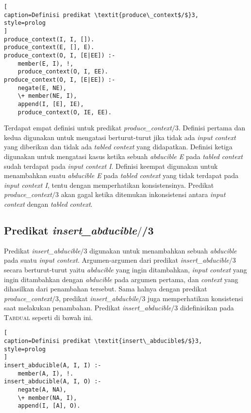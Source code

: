 \begin{lstlisting}[
caption=Definisi predikat \textit{produce\_context$/$}3,
style=prolog
]
produce_context(I, I, []).
produce_context(E, [], E).
produce_context(O, I, [E|EE]) :-
	member(E, I), !,
	produce_context(O, I, EE).
produce_context(O, I, [E|EE]) :-
	negate(E, NE),
	\+ member(NE, I),
	append(I, [E], IE),
	produce_context(O, IE, EE).
\end{lstlisting}

Terdapat empat definisi untuk predikat \textit{produce\_context$/$}3. Definisi pertama dan kedua digunakan untuk mengatasi berturut-turut jika tidak ada \textit{input context} yang diberikan dan tidak ada \textit{tabled context} yang didapatkan. Definisi ketiga digunakan untuk mengatasi kasus ketika sebuah \textit{abducible E} pada \textit{tabled context} sudah terdapat pada \textit{input context I}. Definisi keempat digunakan untuk menambahkan suatu \textit{abducible E} pada \textit{tabled context} yang tidak terdapat pada \textit{input context I}, tentu dengan memperhatikan konsistensinya. Predikat \textit{produce\_context$/$}3 akan gagal ketika ditemukan inkonsistensi antara \textit{input context} dengan \textit{tabled context}.

\subsection{Predikat \textit{insert\_abducible$/$}/3}

Predikat \textit{insert\_abducible$/$}3 digunakan untuk menambahkan sebuah \textit{abducible} pada suatu \textit{input context}. Argumen-argumen dari predikat \textit{insert\_abducible$/$}3 secara berturut-turut yaitu \textit{abducible} yang ingin ditambahkan, \textit{input context} yang ingin ditambahkan dengan \textit{abducible} pada argumen pertama, dan \textit{context} yang dihasilkan dari penambahan tersebut. Sama halnya dengan predikat \textit{produce\_context$/$}3, predikat \textit{insert\_abducbile$/$}3 juga memperhatikan konsistensi saat melakukan penambahan. Predikat \textit{insert\_abducible$/$}3 didefinisikan pada \textsc{Tabdual} seperti di bawah ini.
\\

\begin{lstlisting}[
caption=Definisi predikat \textit{insert\_abducible$/$}3,
style=prolog
]
insert_abducible(A, I, I) :-
	member(A, I), !.
insert_abducible(A, I, O) :-
	negate(A, NA),
	\+ member(NA, I),
	append(I, [A], O).
\end{lstlisting}

